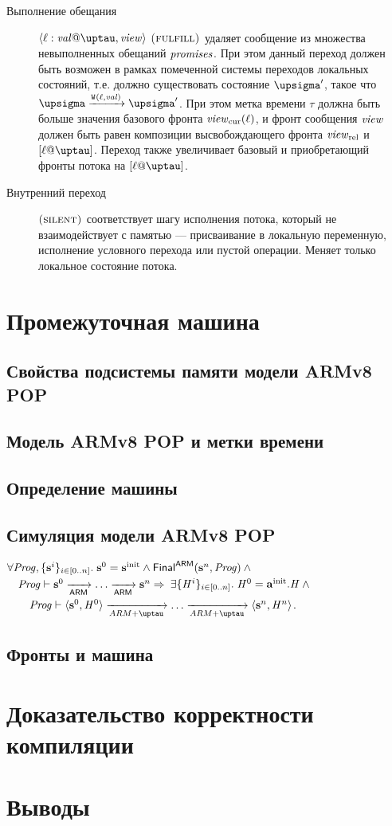 \begin{description}
  \item[Выполнение обещания] $\writeEvt{\loc}{\stval}{\tau}{\R}$ $\textsc{(fulfill)}$ удаляет сообщение из множества
    невыполненных обещаний $\mathit{promises}$. При этом данный переход должен быть возможен в
    рамках помеченной системы переходов локальных состояний, т.е. должно существовать
    состояние $\pstate'$, такое что $\pstate \xrightarrow{\wlab{}{\loc}{\stval}} \pstate'$.
    При этом метка времени $\tau$ должна быть больше значения базового фронта $\mathit{view}_{\mathrm{cur}}(\ell)$,
    и фронт сообщения $\mathit{view}$ должен быть равен композиции высвобождающего фронта $\mathit{view}_{\mathrm{rel}}$
    и $[\loc@\tau]$. Переход также увеличивает базовый и приобретающий фронты потока на $[\loc@\tau]$.

  \item[Внутренний переход] $\textsc{(silent)}$ соответствует шагу исполнения потока, который не взаимодействует
    с памятью --- присваивание в локальную переменную, исполнение условного перехода или пустой операции.
    Меняет только локальное состояние потока.
\end{description}

\section{Промежуточная машина \ARMt}
\subsection{Свойства подсистемы памяти модели ARMv8 POP}
\subsection{Модель ARMv8 POP и метки времени}
\subsection{Определение машины \ARMt}
\subsection{Симуляция модели ARMv8 POP}
\label{sec:armvpop:armt:sim}

\begin{theorem}
  \label{thm:armvpop:armt:sim}
$\forall \mathit{Prog}, \{\mathbf{s}^i\}_{i \in [0..n]}.\; \mathbf{s}^0 = \mathbf{s}^{\rm init}  \land \mathsf{Final}^{\mathsf{ARM}}(\mathbf{s}^n, \mathit{Prog}) \land{}$ \\
${} \quad \mathit{Prog} \vdash \mathbf{s}^0 \xrightarrow[\mathsf{ARM}]{} \dots \xrightarrow[\mathsf{ARM}]{} \mathbf{s}^n \Rightarrow$
$\exists \{\mathit{H}^i\}_{i \in [0..n]}. \; \mathit{H}^0 = \mathbf{a}^{\rm init}.\mathit{H} \land {}$ \\
${} \qquad \Cfarm \vdash \angled{\s^0, \hmap^0} \armStep \dots \armStep \angled{\s^n, \hmap^n}$.
\end{theorem}

\subsection{Фронты и машина \ARMt}

\section{Доказательство корректности компиляции}
\section{Выводы}
